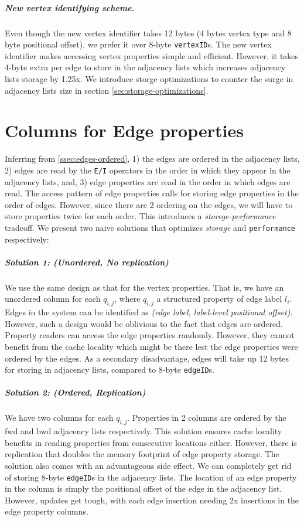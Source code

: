 \vspace{-12pt}
\subparagraph{New vertex identifying scheme.}Even though the new vertex identifier takes 12 bytes (4 bytes vertex type and 8 byte positional offset), we prefer it over 8-byte \texttt{vertexID}s. The new vertex identifier makes accessing vertex properties simple and efficient. However, it takes 4-byte extra per edge to store in the adjacency lists which increases adjacency lists storage by 1.25x. We introduce storge optimizations to counter the surge in adjacency lists size in section \ref{sec:storage-optimizations}.

\section{Columns for Edge properties}
\label{sec:edge-property-columns}

Inferring from \ref{ssec:edges-ordered}, 1) the edges are ordered in the adjacency lists, 2) edges are read by the \texttt{E/I} operators in the order in which they appear in the adjacency lists, and, 3) edge properties are read in the order in which edges are read. The access pattern of edge properties calls for storing edge properties in the order of edges. However, since there are 2 ordering on the edges, we will have to store properties twice for each order. This introduces a \emph{storege-performance} tradeoff. We present two naive solutions that optimizes \emph{storage} and \texttt{performance} respectively:

\vspace{-12pt}
\subparagraph{Solution 1: (Unordered, No replication) } We use the same design as that for the vertex properties. That is, we have an unordered column for each $q_{i,j}$, where $q_{i,j}$ a structured property of edge label $l_i$. Edges in the system can be identified as \emph{(edge label, label-level positional offset)}. However, such a design would be oblivious to the fact that edges are ordered. Property readers can access the edge properties randomly. However, they cannot benefit from the cache locality which might be there lest the edge properties were ordered by the edges. As a secondary disadvantage, edges will take up 12 bytes for storing in adjacency lists, compared to 8-byte \texttt{edgeID}s.

\vspace{-12pt}
\subparagraph{Solution 2: (Ordered, Replication) } We have two columns for each $q_{i,j}$. Properties in 2 columns are ordered by the \gls{fwd} and \gls{bwd} adjacency lists respectively. This solution ensures cache locality benefits in reading properties from consecutive locations either. However, there is replication that doubles the memory footprint of edge property storage. The solution also comes with an advantageous side effect. We can completely get rid of storing 8-byte \texttt{edgeID}s in the adjacency lists. The location of an edge property in the column is simply the positional offset of the edge in the adjacency list. However, updates get tough, with each edge insertion needing 2x insertions in the edge property columns.

